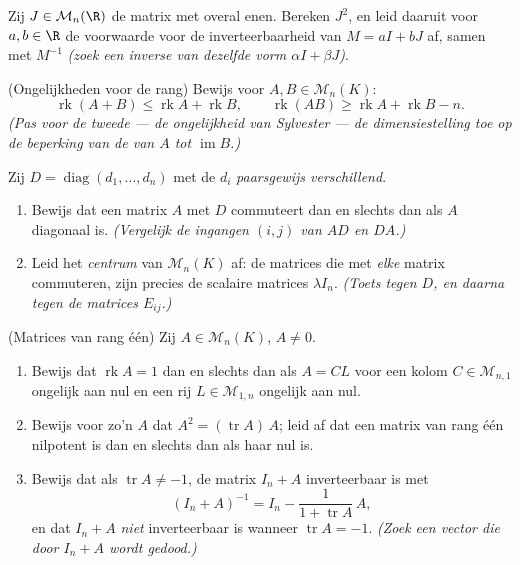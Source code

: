 \begin{exercise}[$\star\star\star$]\label{exo:b1:matrices:9}
Zij $J \in \mathcal{M}_n(\R)$ de matrix met overal enen. Bereken
$J^2$, en leid daaruit voor $a, b \in \R$ de voorwaarde voor de
inverteerbaarheid van $M = aI + bJ$ af, samen met $M^{-1}$
\emph{(zoek een inverse van dezelfde vorm $\alpha I + \beta J$)}.
\end{exercise}

\begin{exercise}[$\star\star\star$]\label{exo:b1:matrices:10}
(Ongelijkheden voor de rang) Bewijs voor $A, B \in
\mathcal{M}_n(K)$:
\[
\operatorname{rk}(A + B) \leq \operatorname{rk} A +
\operatorname{rk} B,
\qquad
\operatorname{rk}(AB) \geq \operatorname{rk} A + \operatorname{rk}
B - n .
\]
\emph{(Pas voor de tweede --- de ongelijkheid van Sylvester --- de
dimensiestelling toe op de beperking van de  van $A$ tot
$\operatorname{im} B$.)}
\end{exercise}

\begin{exercise}[$\star\star$]\label{exo:b1:matrices:11}
Zij $D = \operatorname{diag}(d_1, \dots, d_n)$ met de $d_i$
\emph{paarsgewijs verschillend}.
\begin{enumerate}
  \item Bewijs dat een matrix $A$ met $D$ commuteert dan en slechts
        dan als $A$ diagonaal is. \emph{(Vergelijk de ingangen
        $(i,j)$ van $AD$ en $DA$.)}
  \item Leid het \emph{centrum} van $\mathcal{M}_n(K)$ af: de
        matrices die met \emph{elke} matrix commuteren, zijn precies
        de scalaire matrices $\lambda I_n$. \emph{(Toets tegen $D$,
        en daarna tegen de matrices $E_{ij}$.)}
\end{enumerate}
\end{exercise}

\begin{exercise}[$\star\star\star$]\label{exo:b1:matrices:12}
(Matrices van rang één) Zij $A \in \mathcal{M}_n(K)$, $A \neq 0$.
\begin{enumerate}
  \item Bewijs dat $\operatorname{rk} A = 1$ dan en slechts dan als
        $A = CL$ voor een kolom $C \in \mathcal{M}_{n,1}$ ongelijk
        aan nul en een rij $L \in \mathcal{M}_{1,n}$ ongelijk aan
        nul.
  \item Bewijs voor zo'n $A$ dat $A^2 = (\operatorname{tr} A)\,A$;
        leid af dat een matrix van rang één nilpotent is dan en
        slechts dan als haar  nul is.
  \item Bewijs dat als $\operatorname{tr} A \neq -1$, de matrix
        $I_n + A$ inverteerbaar is met
        \[
        (I_n + A)^{-1} = I_n - \frac{1}{1 + \operatorname{tr}
        A}\,A ,
        \]
        en dat $I_n + A$ \emph{niet} inverteerbaar is wanneer
        $\operatorname{tr} A = -1$. \emph{(Zoek een vector die door
        $I_n + A$ wordt gedood.)}
\end{enumerate}
\end{exercise}

